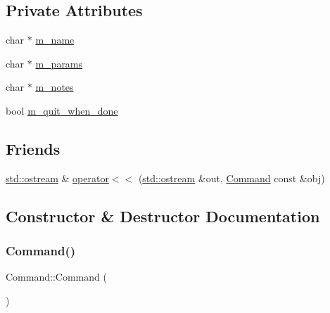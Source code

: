\subsection*{Private Attributes}
\begin{DoxyCompactItemize}
\item 
char $\ast$ \hyperlink{classCommand_a381973cd5a4b999975c0f79e14245821}{m\+\_\+name}
\item 
char $\ast$ \hyperlink{classCommand_ab80277cb25e2e56e59d342d3499fc55a}{m\+\_\+params}
\item 
char $\ast$ \hyperlink{classCommand_a1c278c3a3b397e387cb831cd1a93e3a9}{m\+\_\+notes}
\item 
bool \hyperlink{classCommand_aa1eb67a0888560ab21c503e1f9ffaad4}{m\+\_\+quit\+\_\+when\+\_\+done}
\end{DoxyCompactItemize}
\subsection*{Friends}
\begin{DoxyCompactItemize}
\item 
\hyperlink{doctest_8h_a116af65cb5e924b33ad9d9ecd7a783f3}{std\+::ostream} \& \hyperlink{classCommand_a0a193e228644a3735c309d8b2b5b9899}{operator$<$$<$} (\hyperlink{doctest_8h_a116af65cb5e924b33ad9d9ecd7a783f3}{std\+::ostream} \&out, \hyperlink{classCommand}{Command} const \&obj)
\end{DoxyCompactItemize}


\subsection{Constructor \& Destructor Documentation}
\mbox{\label{classCommand_a18df2d81039392daeb0b78c346a70537}} 
\subsubsection{\texorpdfstring{Command()}{Command()}\hspace{0.1cm}{\footnotesize\ttfamily [1/3]}}
{\footnotesize\ttfamily Command\+::\+Command (\begin{DoxyParamCaption}{ }\end{DoxyParamCaption})}

\mbox{\label{classCommand_ac26b14828c5a72f9bd370421a4788b5d}} 
